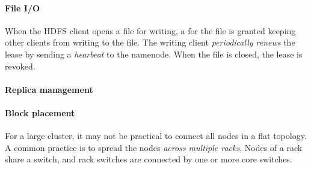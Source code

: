 \documentclass{memo}
\begin{document}
\paragraph{File I/O}
When the HDFS client opens a file for writing, a  for the file is
granted keeping other clients from writing to the file. The writing client
{\em periodically renews} the lease by sending a {\em hearbeat} to the
namenode. When the file is closed, the lease is revoked.

\paragraph{Replica management}

\paragraph{Block placement}
For a large cluster, it may not be practical to connect all nodes in a flat
topology. A common practice is to spread the nodes {\em across multiple
  racks\/}.  Nodes of a rack share a switch, and rack switches are connected
by one or more core switches. 
\end{document}
